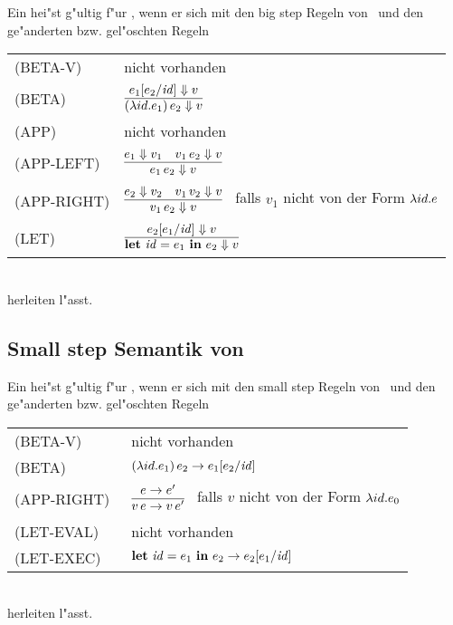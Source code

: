 Ein  hei"st g"ultig f"ur \LTWOCBN, wenn er sich mit den big step Regeln von \LTWO\ und den ge"anderten bzw. gel"oschten Regeln\\[5mm]
  \begin{tabular}{ll}
     \mbox{(BETA-V)}      & nicht vorhanden \\[3mm]
     \mbox{(BETA)}        & $\regel{e_1[e_2/\id] \eval v}
                                   {(\abstr{id}{e_1})\,e_2 \eval v}$ \\[5mm]
     \mbox{(APP)}         & nicht vorhanden \\[3mm]
     \mbox{(APP-LEFT)}    & $\regel{e_1 \eval v_1 \quad v_1\,e_2 \eval v}
                                   {e_1\,e_2 \eval v}$ \\[3mm]
     \mbox{(APP-RIGHT)}   & $\regel{e_2 \eval v_2 \quad v_1\,v_2 \eval v}
                                   {v_1\,e_2 \eval v}$   \ 
                                   falls ${v_1}$ nicht von der Form $\lambda id.e$ \\[5mm]
     \mbox{(LET)}         & $\regel{e_2[e_1/\id] \eval v}
                                   {\bli{\id}{e_1}{e_2} \eval v}$
  \end{tabular}\\[7mm]
herleiten l"asst.


\subsection{Small step Semantik von \LTWOCBN}

Ein  hei"st g"ultig f"ur \LTWOCBN, wenn er sich mit den small step Regeln von \LTWO\ 
und den ge"anderten bzw. gel"oschten Regeln\\[5mm]
  \begin{tabular}{ll}
     \mbox{(BETA-V)}      & nicht vorhanden \\[3mm]
     \mbox{(BETA)}        & $(\lambda id.e_1)\,e_2 \to e_1[e_2/{\text{\it id\/}}]$ \\[5mm]
     \mbox{(APP-RIGHT)\ } & $\regel{e \to e'}
                                   {v\,e \to v\,e'}$   \ 
                                   falls ${v}$ nicht von der Form $\lambda id.e_0$ \\[5mm]
     \mbox{(LET-EVAL)\  } & nicht vorhanden \\[3mm]
     \mbox{(LET-EXEC)}    & $\textbf{let}\ {\text{\it id\/}} = e_1\ \textbf{in}\ e_2 \to e_2[e_1/{\text{\it id\/}}]$
  \end{tabular}\\[7mm]
herleiten l"asst.

